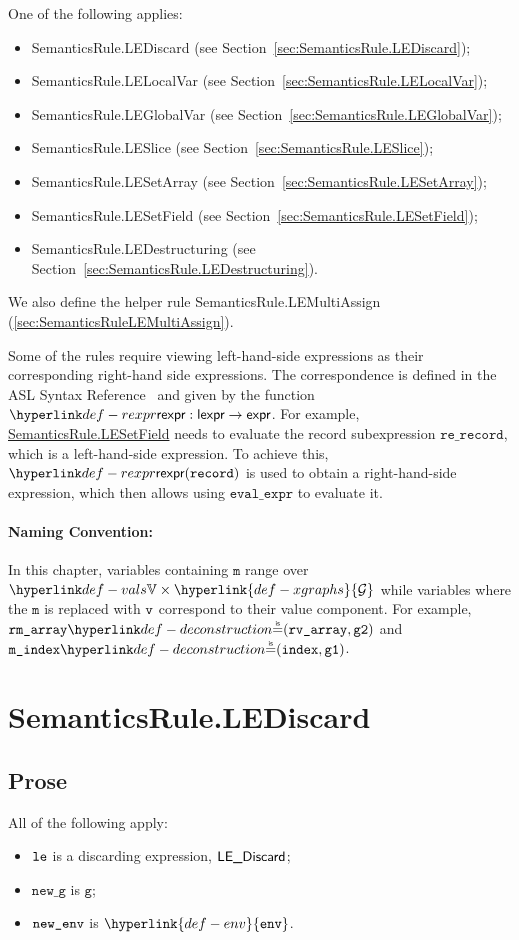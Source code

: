 \documentclass{book}
\newcommand\XGraphs[0]{\hyperlink{def-xgraphs}{\mathcal{G}}}
\newcommand\env[0]{\hyperlink{def-env}{\texttt{env}}}
\newcommand\vg[0]{\texttt{g}}
\newcommand\newg[0]{\texttt{new\_g}}
\newcommand\vm[0]{\texttt{m}}
\newcommand\mindex[0]{\texttt{m\_index}}
\newcommand\rvarray[0]{\texttt{rv\_array}}
\newcommand\rmarray[0]{\texttt{rm\_array}}
\newcommand\record[0]{\texttt{record}}
\newcommand\rerecord[0]{\texttt{re\_record}}
\begin{document}
One of the following applies:
\begin{itemize}
\item SemanticsRule.LEDiscard (see Section~\ref{sec:SemanticsRule.LEDiscard});
\item SemanticsRule.LELocalVar (see Section~\ref{sec:SemanticsRule.LELocalVar});
\item SemanticsRule.LEGlobalVar (see Section~\ref{sec:SemanticsRule.LEGlobalVar});
\item SemanticsRule.LESlice (see Section~\ref{sec:SemanticsRule.LESlice});
\item SemanticsRule.LESetArray (see Section~\ref{sec:SemanticsRule.LESetArray});
\item SemanticsRule.LESetField (see Section~\ref{sec:SemanticsRule.LESetField});
\item SemanticsRule.LEDestructuring (see Section~\ref{sec:SemanticsRule.LEDestructuring}).
\end{itemize}

We also define the helper rule SemanticsRule.LEMultiAssign (\ref{sec:SemanticsRuleLEMultiAssign}).

\hypertarget{def-rexpr}{}
Some of the rules require viewing left-hand-side expressions as their corresponding right-hand side expressions.
The correspondence is defined in the ASL Syntax Reference~\cite[Chapter 5]{ASLAbstractSyntaxReference}
and given by the function $\torexpr : \lexpr \rightarrow \expr$.
%
For example, \hyperlink{SemanticsRule.LESetField}{SemanticsRule.LESetField}
needs to evaluate the record subexpression $\rerecord$, which is a left-hand-side expression.
To achieve this, $\torexpr(\record)$ is used to obtain a right-hand-side expression, which then allows
using $\texttt{eval\_expr}$ to evaluate it.

\paragraph{Naming Convention:}
In this chapter, variables containing $\vm$ range over $\vals\times\XGraphs$
while variables where the $\vm$ is replaced with $\texttt{v}$ correspond to their value component.
For example, $\rmarray\eqname(\rvarray,\vgtwo)$ and $\mindex\eqname(\vindex, \vgone)$.

\section{SemanticsRule.LEDiscard \label{sec:SemanticsRule.LEDiscard}}
    \subsection{Prose}
    All of the following apply:
    \begin{itemize}
    \item $\texttt{le}$ is a discarding expression, $\textsf{LE\_Discard}$;
    \item $\newg$ is $\vg$;
    \item $\texttt{new\_env}$ is $\env$.
    \end{itemize}
\end{document}
